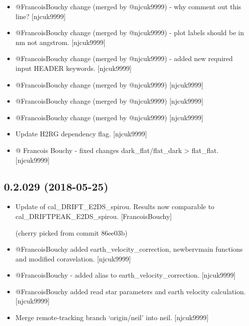 \documentclass[a4paper,10pt,english]{report}
\begin{document}
\begin{itemize}
\begin{description}
\end{description}

\item {} 
@FrancoisBouchy change (merged by @njcuk9999) - why comment out this
line? {[}njcuk9999{]}

\item {} 
@FrancoisBouchy change (merged by @njcuk9999) - plot labels should be
in nm not angstrom. {[}njcuk9999{]}

\item {} 
@FrancoisBouchy change (merged by @njcuk9999) - added new required
input HEADER keywords. {[}njcuk9999{]}

\item {} 
@FrancoisBouchy change (merged by @njcuk9999) {[}njcuk9999{]}

\item {} 
@FrancoisBouchy change (merged by @njcuk9999) {[}njcuk9999{]}

\item {} 
@FrancoisBouchy change (merged by @njcuk9999) {[}njcuk9999{]}

\item {} 
Update H2RG dependency flag. {[}njcuk9999{]}

\item {} 
@ Francois Bouchy - fixed changes dark\_flat/flat\_dark \textendash{}\textgreater{} flat\_flat.
{[}njcuk9999{]}

\end{itemize}


\subsection{0.2.029 (2018-05-25)}
\label{\detokenize{misc/changelog:id429}}\begin{itemize}
\item {} 
Update of cal\_DRIFT\_E2DS\_spirou. Results now comparable to
cal\_DRIFTPEAK\_E2DS\_spirou. {[}FrancoisBouchy{]}

(cherry picked from commit 86ee03b)

\item {} 
@FrancoisBouchy added earth\_velocity\_correction, newbervmain functions
and modified coravelation. {[}njcuk9999{]}

\item {} 
@FrancoisBouchy - added alias to earth\_velocity\_correction.
{[}njcuk9999{]}

\item {} 
@FrancoisBouchy added read star parameters and earth velocity
calculation. {[}njcuk9999{]}

\item {} 
Merge remote-tracking branch ‘origin/neil’ into neil. {[}njcuk9999{]}

\end{itemize}
\end{document}
